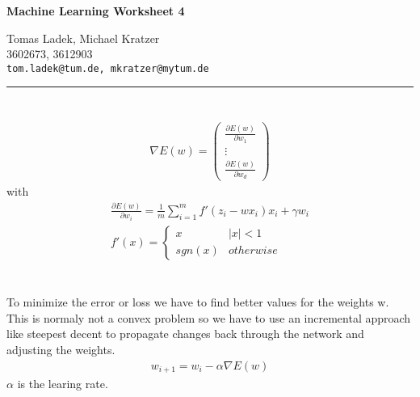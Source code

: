 \documentclass[11pt]{article}
\makeatletter
\newcommand{\exercise}{\section{}}
\newcommand{\hwhead}[4]{
\begin{center}
\sffamily\large\bfseries Machine Learning Worksheet #1
\vspace{2mm}
\normalfont

#2\\
#3\\
\texttt{#4}
\end{center}
\vspace{6mm} \hrule \vspace{4mm}
}
\newcommand{\names}{Tomas Ladek, Michael Kratzer} %
\newcommand{\imats}{3602673, 3612903} %
\newcommand{\emails}{tom.ladek@tum.de, mkratzer@mytum.de} %
\makeatother
\begin{document}
\hwhead{4}{\names}{\imats}{\emails}


\exercise
\begin{align*}
	\nabla E(w) = \begin{pmatrix}
		\frac{\partial E(w)}{\partial w_1} \\
		\vdots \\
		\frac{\partial E(w)}{\partial w_d}
	\end{pmatrix}
\end{align*}
with
\begin{align*}
	\frac{\partial E(w)}{\partial w_i} = \frac{1}{m}\sum_{i=1}^{m}f'(z_i -wx_i)x_i + \gamma w_i \\
	f'(x) = \begin{cases}
		x  & |x|<1 \\
		sgn(x) & otherwise
	\end{cases}
\end{align*}

\exercise
To minimize the error or loss we have to find better values for the weights w. This is normaly not a convex problem so we have to use an incremental approach like steepest decent to propagate changes back through the network and adjusting the weights.
\begin{align}
	w_{i+1} = w_i - \alpha \nabla E(w)
\end{align}
$\alpha$ is the learing rate.
\end{document}
